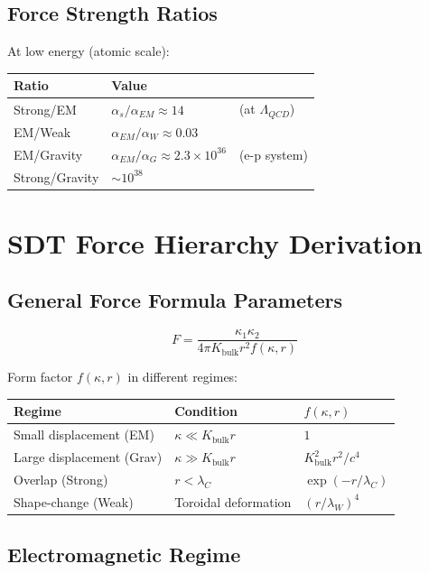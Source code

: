 \documentclass{article}
\begin{document}
\subsection{Force Strength Ratios}

At low energy (atomic scale):

\begin{longtable}{ll}
\toprule
\textbf{Ratio} & \textbf{Value} \\
\midrule
Strong/EM & $\alpha_s/\alpha_{EM} \approx 14$ & (at $\Lambda_{QCD}$) \\
EM/Weak & $\alpha_{EM}/\alpha_W \approx 0.03$ & \\
EM/Gravity & $\alpha_{EM}/\alpha_G \approx 2.3 \times 10^{36}$ & (e-p system) \\
Strong/Gravity & $\sim 10^{38}$ & \\
\bottomrule
\end{longtable}

\section{SDT Force Hierarchy Derivation}

\subsection{General Force Formula Parameters}

\begin{equation}
F = \frac{\kappa_1 \kappa_2}{4\pi K_{\text{bulk}} r^2 f(\kappa, r)}
\end{equation}

Form factor $f(\kappa, r)$ in different regimes:

\begin{longtable}{lll}
\toprule
\textbf{Regime} & \textbf{Condition} & \textbf{$f(\kappa, r)$} \\
\midrule
Small displacement (EM) & $\kappa \ll K_{\text{bulk}} r$ & $1$ \\
Large displacement (Grav) & $\kappa \gg K_{\text{bulk}} r$ & $K_{\text{bulk}}^2 r^2 / c^4$ \\
Overlap (Strong) & $r < \lambda_C$ & $\exp(-r/\lambda_C)$ \\
Shape-change (Weak) & Toroidal deformation & $(r/\lambda_W)^4$ \\
\bottomrule
\end{longtable}

\subsection{Electromagnetic Regime}
\end{document}
